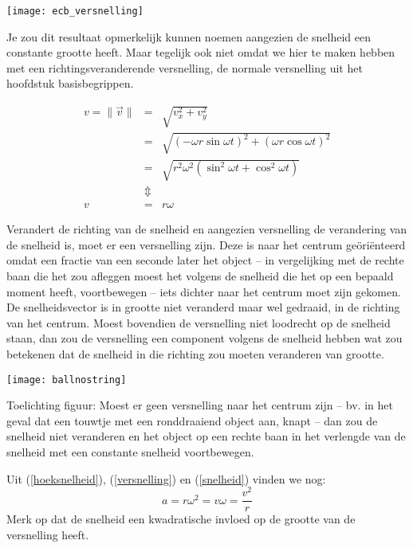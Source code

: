 \documentclass{ximera}
\begin{document}
\begin{image}
	\texttt{[image: ecb\_versnelling]}
\end{image}

Je zou dit resultaat opmerkelijk kunnen noemen aangezien de snelheid een constante grootte heeft.
Maar tegelijk ook niet omdat we hier te maken hebben met een richtingsveranderende versnelling, de normale versnelling uit het hoofdstuk basisbegrippen.

\begin{eqnarray}
	v=\parallel\vec{v}\parallel&=&\sqrt{v_x^2+v_y^2}\nonumber\\
	&=&\sqrt{(-\omega r\sin\omega t)^2+(\omega r\cos\omega t)^2}\nonumber\\
	&=&\sqrt{r^2\omega^2(\sin^2\omega t+\cos^2\omega t)}\nonumber\\
	&\Updownarrow&\nonumber\\
	v&=&r\omega\label{snelheid}
\end{eqnarray}

 Verandert de richting van de snelheid en aangezien versnelling de verandering van de snelheid is, moet er een versnelling zijn. 
 Deze is naar het centrum ge\"ori\"enteerd omdat een fractie van een seconde later het object -- in vergelijking met de rechte baan die het zou afleggen moest het volgens de snelheid die het op een bepaald moment heeft, voortbewegen -- iets dichter naar het centrum moet zijn gekomen. 
 De snelheidsvector is in grootte niet veranderd maar wel gedraaid, in de richting van het centrum. 
 Moest bovendien de versnelling niet loodrecht op de snelheid staan, dan zou de versnelling een component volgens de snelheid hebben wat zou betekenen dat de snelheid in die richting zou moeten veranderen van grootte.

\begin{image}
	\texttt{[image: ballnostring]}
\end{image}
Toelichting figuur: Moest er geen versnelling naar het centrum zijn -- bv. in het geval dat een touwtje met een ronddraaiend object aan, knapt -- dan zou de snelheid niet veranderen en het object op een rechte baan in het verlengde van de snelheid met een constante snelheid voortbewegen.

Uit (\ref{hoeksnelheid}), (\ref{versnelling}) en (\ref{snelheid}) vinden we nog:
\begin{equation}
	a=r\omega^2=v\omega=\frac{v^2}{r}
\end{equation}
Merk op dat de snelheid een kwadratische invloed op de grootte van de versnelling heeft.
\end{document}
